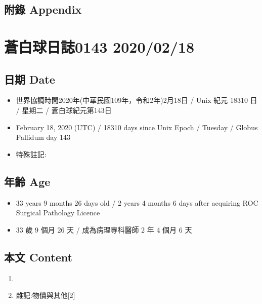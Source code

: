 \documentclass[
]{article}
\providecommand{\tightlist}{%
  \setlength{\itemsep}{0pt}\setlength{\parskip}{0pt}}
\begin{document}
\hypertarget{ux9644ux9304-appendix-16}{%
\subsection{附錄 Appendix}\label{ux9644ux9304-appendix-16}}

\hypertarget{ux84bcux767dux7403ux65e5ux8a8c0143-20200218}{%
\section{蒼白球日誌0143
2020/02/18}\label{ux84bcux767dux7403ux65e5ux8a8c0143-20200218}}

\hypertarget{ux65e5ux671f-date-17}{%
\subsection{日期 Date}\label{ux65e5ux671f-date-17}}

\begin{itemize}
\tightlist
\item
  世界協調時間2020年(中華民國109年，令和2年)2月18日 / Unix 紀元 18310 日
  / 星期二 / 蒼白球紀元第143日
\item
  February 18, 2020 (UTC) / 18310 days since Unix Epoch / Tuesday /
  Globus Pallidum day 143
\item
  特殊註記:
\end{itemize}

\hypertarget{ux5e74ux9f61-age-17}{%
\subsection{年齡 Age}\label{ux5e74ux9f61-age-17}}

\begin{itemize}
\tightlist
\item
  33 years 9 months 26 days old / 2 years 4 months 6 days after
  acquiring ROC Surgical Pathology Licence
\item
  33 歲 9 個月 26 天 / 成為病理專科醫師 2 年 4 個月 6 天
\end{itemize}

\hypertarget{ux672cux6587-content-17}{%
\subsection{本文 Content}\label{ux672cux6587-content-17}}

\begin{enumerate}
\def\labelenumi{\arabic{enumi}.}
\item
\item
  雜記:物價與其他{[}2{]}
\end{enumerate}
\end{document}
